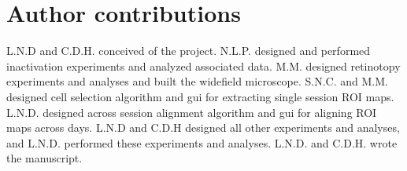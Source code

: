 \section{Author contributions}
L.N.D and C.D.H. conceived of the project. N.L.P. designed and performed inactivation experiments and analyzed associated data. M.M. designed retinotopy experiments and analyses and built the widefield microscope. S.N.C. and M.M. designed cell selection algorithm and gui for extracting single session ROI maps. L.N.D. designed across session alignment algorithm and gui for aligning ROI maps across days. L.N.D and C.D.H designed all other experiments and analyses, and L.N.D. performed these experiments and analyses. L.N.D. and C.D.H. wrote the manuscript. 